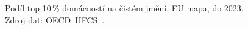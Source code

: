 \def\strEuBohatstviMapaTitle{Podíl top 10\,\% domácností na čistém jmění (do 2023)}%
\def\strEuBohatstviMapaColorbarLabel{podíl top 10\,\% na čistém jmění [\%]}%
\def\strEuBohatstviMapaCaption{Podíl top 10\,\% domácností na čistém jmění, EU mapa, do 2023. Zdroj dat: \acs{OECD}~\acs{HFCS}~\cite{oecd_hfcs_wealth_top10_PC}.}%
%
\begin{figure}[htbp]
  \centering
  \resizebox{\linewidth}{!}{}
  \caption{\strEuBohatstviMapaCaption}
  \label{fig:eu_bohatstvi_mapa}
\end{figure}
